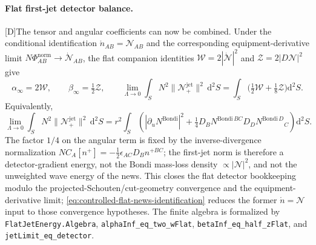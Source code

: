 \documentclass[11pt,a4paper]{article}
\newcommand{\cN}{\mathcal{N}}
\newcommand{\diff}{\mathrm{d}}
\newcommand{\statusD}{\textsf{[D]}}
\begin{document}
\paragraph{Flat first-jet detector balance.}
\statusD The tensor and angular coefficients can now be combined.  Under the conditional identification \(\mathring n_{AB}=\mathcal N_{AB}\) and the corresponding equipment-derivative limit \(N\Phi^{\mathrm{norm}}_{AB}\to\dot{\mathcal N}_{AB}\), the flat companion identities \(\mathcal W=2|\dot{\mathcal N}|^2\) and \(\mathcal Z=2|D\mathcal N|^2\) give
\begin{equation}\label{eq:flat-jet-detector-balance}
  \alpha_\infty=2\mathcal W,
  \qquad
  \beta_\infty=\tfrac12\mathcal Z,
  \qquad
  \lim_{\Lambda\to0}\int_S N^2\|\cN^{\mathrm{jet}}_+\|^2\,\diff^2S
  =
  \int_S\Big(\tfrac12\mathcal W+\tfrac18\mathcal Z\Big)\diff^2S .
\end{equation}
Equivalently,
\begin{equation}\label{eq:flat-jet-bondi-gradient}
  \lim_{\Lambda\to0}\int_S N^2\|\cN^{\mathrm{jet}}_+\|^2\,\diff^2S
  =
  r^2\int_S\left(
  |\partial_uN^{\mathrm{Bondi}}|^2
  +
  \tfrac14 D_BN^{\mathrm{Bondi}\,BC}D_DN^{\mathrm{Bondi}\,D}{}_C
  \right)\diff^2S .
\end{equation}
The factor \(1/4\) on the angular term is fixed by the inverse-divergence normalization \(NC_A[n^+]=-\tfrac12\epsilon_{AC}D_Bn^{+BC}\); the first-jet norm is therefore a detector-gradient energy, not the Bondi mass-loss density \(\propto|\mathcal N|^2\), and not the unweighted wave energy of the news.  This closes the flat detector bookkeeping modulo the projected-Schouten/cut-geometry convergence and the equipment-derivative limit; \eqref{eq:controlled-flat-news-identification} reduces the former \(\mathring n=\mathcal N\) input to those convergence hypotheses.  The finite algebra is formalized by \texttt{FlatJetEnergy.Algebra}, \texttt{alphaInf\_eq\_two\_wFlat}, \texttt{betaInf\_eq\_half\_zFlat}, and \texttt{jetLimit\_eq\_detector}.
\end{document}

